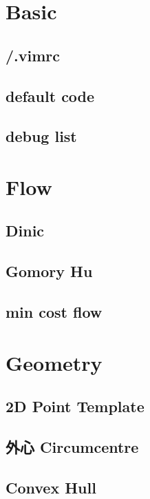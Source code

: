 \section{Basic}

\subsection{/.vimrc}

\subsection{default code}

\subsection{debug list}


\section{Flow}

\subsection{Dinic}

\subsection{Gomory Hu}

\subsection{min cost flow}


\section{Geometry}

\subsection{2D Point Template}

\subsection{外心 Circumcentre}

\subsection{Convex Hull}

